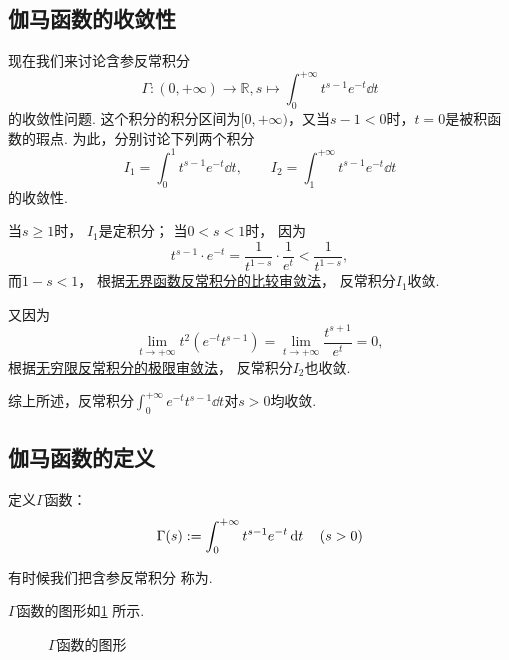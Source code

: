 \subsection{伽马函数的收敛性}
现在我们来讨论含参反常积分\[
	\Gamma\colon(0,+\infty)\to\mathbb{R},
	s \mapsto \int_0^{+\infty} t^{s-1} e^{-t} \dd{t}
\]的收敛性问题.
这个积分的积分区间为\([0,+\infty)\)，又当\(s-1<0\)时，\(t=0\)是被积函数的瑕点.
为此，分别讨论下列两个积分\[
	I_1 = \int_0^1 t^{s-1} e^{-t} \dd{t},
	\qquad
	I_2 = \int_1^{+\infty} t^{s-1} e^{-t} \dd{t}
\]的收敛性.

当\(s \geq 1\)时，
\(I_1\)是定积分；
当\(0 < s < 1\)时，
因为\[
	t^{s-1} \cdot e^{-t}
	= \frac{1}{t^{1-s}} \cdot \frac{1}{e^t} < \frac{1}{t^{1-s}},
\]
而\(1-s < 1\)，
根据\hyperref[theorem:定积分.无界函数的反常积分的比较审敛法]{无界函数反常积分的比较审敛法}，
反常积分\(I_1\)收敛.

又因为\[
	\lim_{t\to+\infty} t^2 (e^{-t} t^{s-1})
	= \lim_{t\to+\infty} \frac{t^{s+1}}{e^t} = 0,
\]
根据\hyperref[theorem:定积分.无穷限反常积分的极限审敛法]{无穷限反常积分的极限审敛法}，
反常积分\(I_2\)也收敛.

综上所述，反常积分\(\int_0^{+\infty} e^{-t} t^{s-1} \dd{t}\)对\(s > 0\)均收敛.

\subsection{伽马函数的定义}
\begin{definition}
定义\(\Gamma\)函数：
\begin{equation}\label{equation:特殊函数.伽马函数的积分定义}
	\Gamma(s)
	:=
	\int_0^{+\infty} t^{s-1} e^{-t} \dd{t}
	\quad(s>0)
\end{equation}
\end{definition}
有时候我们把含参反常积分 
称为.

\(\Gamma\)函数的图形如\cref{figure:定积分.伽马函数} 所示.

\begin{figure}%
	\centering
	\caption{\(\Gamma\)函数的图形}
	\label{figure:定积分.伽马函数}
\end{figure}


